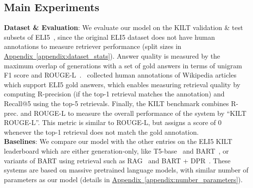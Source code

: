 \documentclass[11pt]{article}
\newcommand{\namedref}[2]{\hyperref[#2]{#1~\ref*{#2}}}
\newcommand{\appendixref}[1]{\namedref{Appendix}{#1}}
\begin{document}
 \subsection{Main Experiments}
\label{sec:experiments}


\noindent \textbf{Dataset \& Evaluation}: We evaluate our model on the KILT validation \& test subsets of ELI5~\citep{petroni2020kilt}, since the original ELI5 dataset does not have human annotations to measure retriever performance (split sizes in \appendixref{appendix:dataset_stats}). 
Answer
quality is measured by the maximum overlap of generations with a set of gold answers in 
terms of unigram F1 score and ROUGE-L~\citep{lin-2004-rouge}.~\citet{petroni2020kilt} collected human annotations of Wikipedia articles which support 
ELI5 gold answers, which enables measuring retrieval quality by computing R-precision (if
the top-1 retrieval matches the annotation) and Recall@5 using the top-5 
retrievals. Finally, the KILT benchmark combines R-prec. and 
ROUGE-L to measure the overall performance of the system by ``KILT ROUGE-L''. This metric is similar to ROUGE-L, but assigns a score of 0 whenever the top-1 retrieval does not match the gold annotation.\\


\noindent \textbf{Baselines}: We compare our model with the other entries on the ELI5 KILT leaderboard which are either generation-only, like T5-base~\citep{raffel2019exploring} and BART~\citep{lewis2019bart}, or variants of BART using retrieval such as RAG~\citep{lewis2020retrieval} and BART + DPR~\citep{petroni2020kilt}. These systems are based on massive pretrained language models, with similar number of parameters as our model (details in \appendixref{appendix:number_parameters}).\\
\end{document}
